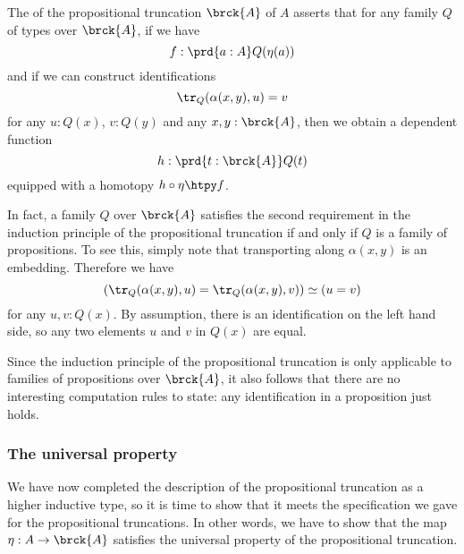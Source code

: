 \begin{defn}
  The  of the propositional truncation $\brck{A}$ of $A$ asserts that for any family $Q$ of types over $\brck{A}$, if we have
  \begin{equation*}
    f:\prd{a:A}Q(\eta(a))
  \end{equation*}
  and if we can construct identifications
  \begin{equation*}
    \tr_Q(\alpha(x,y),u)=v
  \end{equation*}
  for any $u:Q(x)$, $v:Q(y)$ and any $x,y:\brck{A}$, then we obtain a dependent function
  \begin{equation*}
    h:\prd{t:\brck{A}}Q(t)
  \end{equation*}
  equipped with a homotopy $h\circ\eta\htpy f$.
\end{defn}

\begin{rmk}
  In fact, a family $Q$ over $\brck{A}$ satisfies the second requirement in the induction principle of the propositional truncation if and only if $Q$ is a family of propositions. To see this, simply note that transporting along $\alpha(x,y)$ is an embedding. Therefore we have
  \begin{equation*}
    (\tr_Q(\alpha(x,y),u)=\tr_Q(\alpha(x,y),v))\simeq (u=v)
  \end{equation*}
  for any $u,v:Q(x)$. By assumption, there is an identification on the left hand side, so any two elements $u$ and $v$ in $Q(x)$ are equal.

  Since the induction principle of the propositional truncation is only applicable to families of propositions over $\brck{A}$, it also follows that there are no interesting computation rules to state: any identification in a proposition just holds.
\end{rmk}

\subsubsection{The universal property}
We have now completed the description of the propositional truncation as a higher inductive type, so it is time to show that it meets the specification we gave for the propositional truncations. In other words, we have to show that the map $\eta:A\to\brck{A}$ satisfies the universal property of the propositional truncation.

